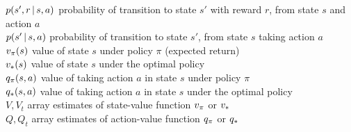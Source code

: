 \documentclass[a4paper, twoside, 12pt]{article}
\begin{document}
\begin{tabbing}
    \>$\p(s',r|s,a)$      \> probability of transition to state $s'$ with reward $r$, from state $s$ and action $a$\\
    \>$\p(s'|s,a)$        \> probability of transition to state $s'$, from state $s$ taking action $a$\\
    \>$v_\pi(s)$           \> value of state $s$ under policy $\pi$ (expected return)\\
    \>$v_*(s)$         \> value of state $s$ under the optimal policy \\
    \>$q_\pi(s,a)$         \> value of taking action $a$ in state $s$ under policy $\pi$\\
    \>$q_*(s,a)$       \> value of taking action $a$ in state $s$ under the optimal policy \\
    \>$V, V_t$            \> array estimates of state-value function $v_\pi$ or $v_*$\\
    \>$Q, Q_t$            \> array estimates of action-value function $q_\pi$ or $q_*$\\

\end{tabbing}
\end{document}

